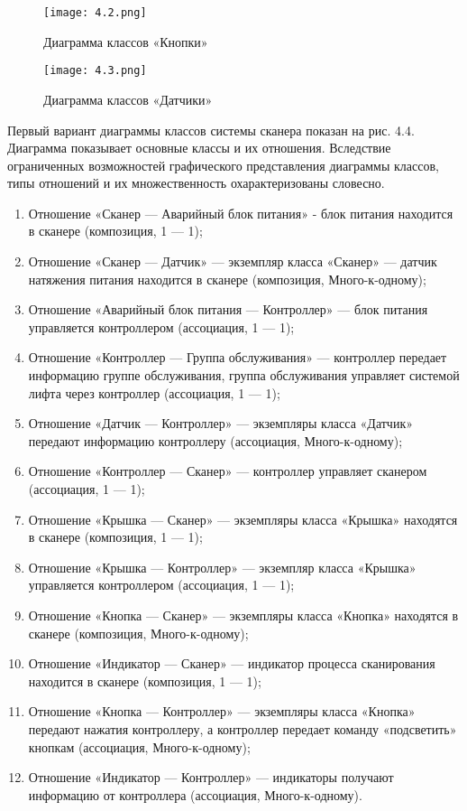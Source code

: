 \documentclass[12pt]{article}
\begin{document}
    \begin{figure}[h]
        \texttt{[image: 4.2.png]}
        \centering
        \caption{Диаграмма классов «Кнопки»}
    \end{figure}

    \begin{figure}[h]
        \texttt{[image: 4.3.png]}
        \centering
        \caption{Диаграмма классов «Датчики»}
    \end{figure}

    Первый вариант диаграммы классов системы сканера показан на рис. 4.4. Диаграмма показывает основные классы и их отношения. Вследствие ограниченных возможностей графического представления диаграммы классов, типы отношений и их множественность охарактеризованы словесно.

    \begin{enumerate}
        \item Отношение «Сканер --- Аварийный блок питания» - блок питания находится в сканере (композиция, 1 --- 1);
        \item Отношение «Сканер --- Датчик» --- экземпляр класса «Сканер» --- датчик натяжения питания находится в сканере (композиция, Много-к-одному);
        \item Отношение «Аварийный блок питания --- Контроллер» --- блок питания управляется контроллером (ассоциация, 1 --- 1);
        \item Отношение «Контроллер --- Группа обслуживания» --- контроллер передает информацию группе обслуживания, группа обслуживания управляет системой лифта через контроллер (ассоциация, 1 --- 1);
        \item Отношение «Датчик --- Контроллер» --- экземпляры класса «Датчик» передают информацию контроллеру (ассоциация, Много-к-одному);
        \item Отношение «Контроллер --- Сканер» --- контроллер управляет сканером (ассоциация, 1 --- 1);
        \item Отношение «Крышка --- Сканер» --- экземпляры класса «Крышка» находятся в сканере (композиция, 1 --- 1);
        \item Отношение «Крышка --- Контроллер» --- экземпляр класса «Крышка» управляется контроллером (ассоциация, 1 --- 1);
        \item Отношение «Кнопка --- Сканер» --- экземпляры класса «Кнопка» находятся в сканере (композиция, Много-к-одному);
        \item Отношение «Индикатор --- Сканер» --- индикатор процесса сканирования находится в сканере (композиция, 1 --- 1);
        \item Отношение «Кнопка --- Контроллер» --- экземпляры класса «Кнопка» передают нажатия контроллеру, а контроллер передает команду «подсветить» кнопкам (ассоциация, Много-к-одному);
        \item Отношение «Индикатор --- Контроллер» --- индикаторы получают информацию от контроллера (ассоциация, Много-к-одному).
    \end{enumerate}
\end{document}
